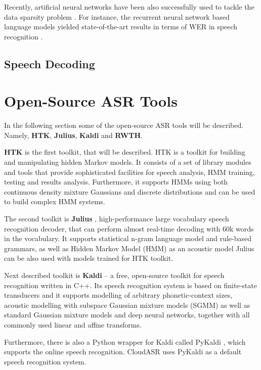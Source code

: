 Recently, artificial neural networks have been also successfully used to tackle the data sparsity problem \cite{bengio2003neural}.
For instance, the recurrent neural network based language models yielded state-of-the-art results in terms of WER in speech recognition \cite{mikolov2010recurrent}.


\subsection{Speech Decoding}
\BLIND
\BLIND


\section{Open-Source ASR Tools}
In the following section some of the open-source ASR tools will be described.
Namely, \textbf{HTK}, \textbf{Julius}, \textbf{Kaldi} and \textbf{RWTH}.


\textbf{HTK} \cite{young1997htk} is the first toolkit, that will be described.
HTK is a toolkit for building and manipulating hidden Markov models.
It consists of a set of library modules and tools that provide sophisticated facilities for speech analysis, HMM training, testing and results analysis.
Furthermore, it supports HMMs using both continuous density mixture Gaussians and discrete distributions and can be used to build complex HMM systems.

The second toolkit is \textbf{Julius} \cite{lee2001julius}, high-performance large vocabulary speech recognition decoder,
  that can perform almost real-time decoding with 60k words in the vocabulary.
It supports statistical n-gram language model and rule-based grammars,
  as well as Hidden Markov Model (HMM) as an acoustic model
Julius can be also used with models trained for HTK toolkit.

Next described toolkit is \textbf{Kaldi} \cite{povey2011kaldi} -- a free, open-source toolkit for speech recognition written in C++.
Its speech recognition system is based on finite-state transducers
  and it supports modelling of arbitrary phonetic-context sizes,
  acoustic modelling with subspace Gaussian mixture models (SGMM)
  as well as standard Gaussian mixture models and deep neural networks,
  together with all commonly used linear and affine transforms.

Furthermore, there is also a Python wrapper for Kaldi called PyKaldi \cite{platek2014free},
  which supports the online speech recognition.
CloudASR uses PyKaldi as a default speech recognition system.

